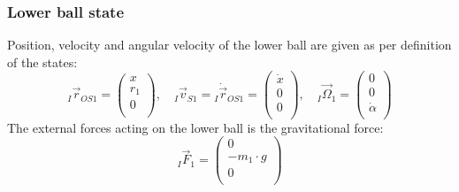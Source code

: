 \documentclass{article}
\begin{document}
\subsubsection{Lower ball state}
Position, velocity and angular velocity of the lower ball are given as per definition of the states:
\begin{equation}
{}_I \vec{r}_{OS1} =
\left( {\begin{array}{c} x \\ r_1 \\ 0 \\ \end{array} } \right), \quad
{}_I \vec{v}_{S1} = {}_I \dot{\vec{r}}_{OS1} =
\left( {\begin{array}{c} \dot{x} \\ 0 \\ 0 \\ \end{array} } \right), \quad
{}_I \vec{\Omega}_1 =
\left( {\begin{array}{c} 0 \\ 0 \\ \dot{\alpha} \\ \end{array} } \right)
\end{equation}
The external forces acting on the lower ball is the gravitational force:
\begin{equation}
{}_I \vec{F}_{1} = \left( {\begin{array}{c} 0 \\ -m_1 \cdot g \\ 0 \\ \end{array} } \right)
\end{equation}
\end{document}
